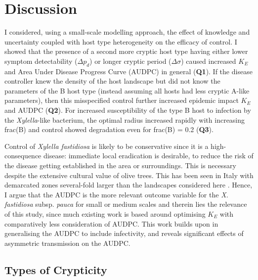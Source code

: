 \documentclass[11pt,letterpaper]{article}
\begin{document}
\section*{Discussion}

 I considered, using a small-scale modelling approach, the effect of knowledge and uncertainty coupled with host type heterogeneity on the efficacy of control. I showed that the presence of a second more cryptic host type having either lower symptom detectability ($\Delta p_d$) or longer cryptic period ($\Delta \sigma$) caused increased $K_E$ and Area Under Disease Progress Curve (AUDPC) in general (\textbf{Q1}). If the disease controller knew the density of the host landscape but did not know the parameters of the B host type (instead assuming all hosts had less cryptic A-like parameters), then this misspecified control further increased epidemic impact $K_E$ and AUDPC (\textbf{Q2}). For increased susceptibility of the type B host to infection by the \emph{Xylella}-like bacterium, the optimal radius increased rapidly with increasing frac(B) and control showed degradation even for frac(B) = 0.2 (\textbf{Q3}). 
 
 Control of \emph{Xylella fastidiosa} is likely to be conservative since it is a high-consequence disease: immediate local eradication is desirable, to reduce the risk of the disease getting established in the area or surroundings. This is necessary despite the extensive cultural value of olive trees. This has been seen in Italy with demarcated zones several-fold larger than the landscapes considered here \cite{Bragard2019}. Hence, I argue that the AUDPC is the more relevant outcome variable for the \emph{X. fastidiosa} subsp. \emph{pauca} for small or medium scales and therein lies the relevance of this study, since much existing work is based around optimising $K_E$ with comparatively less consideration of AUDPC. This work builds upon \cite{Cunniffe2015} in generalising the AUDPC to include infectivity, and reveals significant effects of asymmetric transmission on the AUDPC. 

\subsection*{Types of Crypticity}
\end{document}
